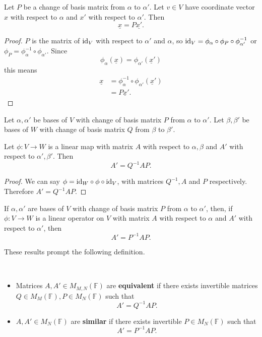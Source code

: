\begin{prop}
    Let $P$ be a change of basis matrix from $\alpha$ to $\alpha'$. Let $v \in V$ have coordinate vector $x$ with respect to $\alpha$ and $x'$ with respect to $\alpha'$. Then
    \[\underline{x} = P \underline{x'}.\]
\end{prop}
\begin{proof}
  $P$ is the matrix of $\mathrm{id}_V$ with respect to $\alpha'$ and $\alpha$, so $\mathrm{id}_V = \phi_{\alpha} \circ \phi_P \circ \phi_{\alpha'}^{-1}$ or $\phi_P = \phi_\alpha^{-1} \circ \phi_{\alpha'}$. Since
  \[\phi_{\alpha}(\underline{x}) = \phi_{\alpha'}(\underline{x}')\]
  this means
  \begin{align*}
    \underline{x} &= \phi_\alpha^{-1} \circ \phi_{\alpha'}(\underline{x}') \\
                  &= P \underline{x}'
  .\end{align*}
\end{proof}

\begin{prop}
    Let $\alpha, \alpha'$ be bases of $V$ with change of basis matrix $P$ from $\alpha$ to $\alpha'$. Let $\beta, \beta'$ be bases of $W$ with change of basis matrix $Q$ from $\beta$ to $\beta'$.

    Let $\phi : V \rightarrow W$ is a linear map with matrix $A$ with respect to $\alpha, \beta$ and $A'$ with respect to $\alpha', \beta'$. Then
    \[A' = Q^{-1} A P.\]
\end{prop}
\begin{proof}
  We can say $\phi = \mathrm{id}_W \circ \phi \circ \mathrm{id}_V$, with matrices $Q^{-1}, A$ and $P$ respectively. Therefore $A' = Q^{-1} A P$.
\end{proof}

\begin{corollary}
    If $\alpha, \alpha'$ are bases of $V$ with change of basis matrix $P$ from $\alpha$ to $\alpha'$, then, if $\phi : V \rightarrow W$ is a linear operator on $V$ with matrix $A$ with respect to $\alpha$ and $A'$ with respect to $\alpha'$, then
    \[A' = P^{-1} A P.\]
\end{corollary}

These results prompt the following definition.
\begin{definition} $ $

  \begin{itemize}
    \item Matrices $A, A' \in M_{M,N}(\mathbb{F})$ are {\bf equivalent} if there exists invertible matrices $Q \in M_M(\mathbb{F}), P \in M_N(\mathbb{F})$ such that
      \[A' = Q^{-1} A P.\]
    \item $A, A' \in M_{N}(\mathbb{F})$ are {\bf similar} if there exists invertible $P \in M_N(\mathbb{F})$ such that
      \[A' = P^{-1} A P.\]
  \end{itemize}
    
\end{definition}

